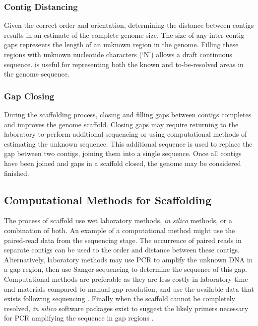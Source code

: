 \documentclass[10pt]{bmc_article}
\newenvironment{bmcformat}{\begin{raggedright}\baselineskip20pt\sloppy\setboolean{publ}{false}}{\end{raggedright}\baselineskip20pt\sloppy}
\begin{document}
\begin{bmcformat}
\subsubsection*{Contig Distancing} %

Given the correct order and orientation, determining the distance between
contigs results in an estimate of the complete genome size. The size of any
inter-contig gaps represents the length of an unknown region in the genome.
Filling these regions with unknown nucleotide characters (`N') allows a draft
continuous sequence.  is useful for representing
both the known and to-be-resolved areas in the genome sequence.

\subsubsection*{Gap Closing} %

During the scaffolding process, closing and filling gaps between contigs
completes and improves the genome scaffold. Closing gaps may require returning
to the laboratory to perform additional sequencing or using computational
methods of estimating the unknown sequence. This additional sequence is
used to replace the gap between two contigs, joining them into
a single sequence. Once all contigs have been joined and gaps in a scaffold
closed, the genome may be considered finished.

\subsection*{Computational Methods for Scaffolding} %

The process of  scaffold  use wet laboratory methods, \emph{in silico}
methods, or a combination of both. An example of a computational method might
use the  paired-read data from the sequencing stage.
 The occurrence of paired reads in separate contigs can be used to
 the order and
distance between these contigs. Alternatively, laboratory methods may use PCR
to amplify the unknown DNA in a gap region, then use 
Sanger sequencing to determine the sequence of this gap. Computational methods
are  preferable as they are less costly in laboratory time and
materials compared to manual gap resolution, and use the available data that
exists following sequencing \cite{nagarajan2010}. Finally when the scaffold
cannot be completely resolved, \emph{in silico} software packages exist to
suggest the likely primers necessary for PCR amplifying the sequence in gap
regions \cite{gordon2001}. \pb


\end{bmcformat}
\end{document}
